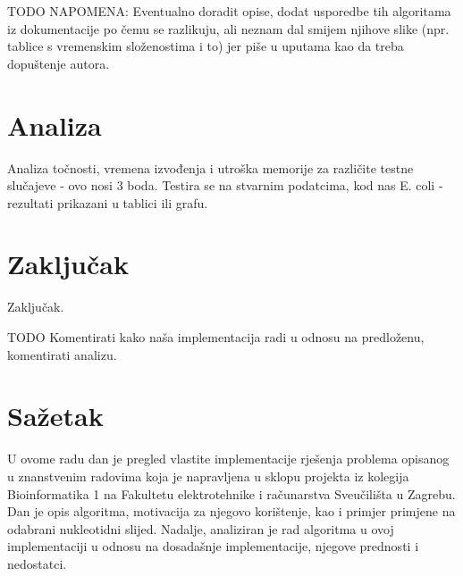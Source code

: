 \documentclass[times, utf8, seminar, numeric]{fer}
\begin{document}
TODO NAPOMENA: Eventualno doradit opise, dodat usporedbe tih algoritama iz dokumentacije po čemu se razlikuju, ali neznam dal smijem njihove slike (npr. tablice s vremenskim složenostima i to) jer piše u uputama kao da treba dopuštenje autora. 

 
\chapter{Analiza}

Analiza točnosti, vremena izvođenja i utroška memorije za različite testne slučajeve - ovo nosi 3 boda. Testira se na stvarnim podatcima, kod nas E. coli - rezultati prikazani u tablici ili grafu.

\chapter{Zaključak}
Zaključak.

TODO Komentirati kako naša implementacija radi u odnosu na predloženu, komentirati analizu.




\chapter{Sažetak}
U ovome radu dan je pregled vlastite implementacije rješenja problema opisanog u znanstvenim radovima koja je napravljena u sklopu projekta iz kolegija Bioinformatika 1 na Fakultetu elektrotehnike i računarstva Sveučilišta u Zagrebu. Dan je opis algoritma, motivacija za njegovo korištenje, kao i primjer primjene na odabrani nukleotidni slijed. Nadalje, analiziran je rad algoritma u ovoj implementaciji u odnosu na dosadašnje implementacije, njegove prednosti i nedostatci. \\
\end{document}
